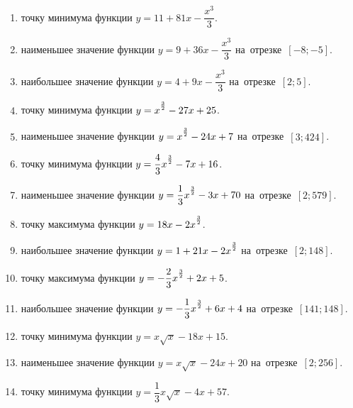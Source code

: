 \documentclass[a4paper,10pt]{article}
\begin{document}
\begin{enumerate}
\item {} точку минимума функции $y=11 +81x-\dfrac{x^3}{3}$.

\item {} наименьшее значение функции $y=9 +36x-\dfrac{x^3}{3}$ на~отрезке~$\left[-8;-5\right]$.

\item {} наибольшее значение функции $y=4 +9x-\dfrac{x^3}{3}$ на~отрезке~$\left[2;5\right]$.

\item {} точку минимума функции $y=x\strut^{\frac{3}{2}} -27x+25$.

\item {} наименьшее значение функции $y=x\strut^{\frac{3}{2}} -24x+7$ на~отрезке~$\left[3;424\right]$.

\item {} точку минимума функции $y=\dfrac{4}{3}x\strut^{\frac{3}{2}} -7x+16$.

\item {} наименьшее значение функции $y=\dfrac{1}{3}x\strut^{\frac{3}{2}} -3x+70$ на~отрезке~$\left[2;579\right]$.

\item {} точку максимума функции $y=18x-2x\strut^{\frac{3}{2}}$.

\item {} наибольшее значение функции $y=1+21x-2x\strut^{\frac{3}{2}}$ на~отрезке~$\left[2;148\right]$.







\item {} точку максимума функции $y=-\dfrac{2}{3}x\strut^{\frac{3}{2}} +2x+5$.

\item {} наибольшее значение функции $y=-\dfrac{1}{3}x\strut^{\frac{3}{2}} +6x+4$ на~отрезке~$\left[141;148\right]$.

\item {} точку минимума функции $y=x\sqrt{x} -18x+15$.

\item {} наименьшее значение функции $y=x\sqrt{x} -24x+20$ на~отрезке~$\left[2;256\right]$.

\item {} точку минимума функции $y=\dfrac{1}{3}x\sqrt{x} -4x+57$.


\end{enumerate}
\end{document}
